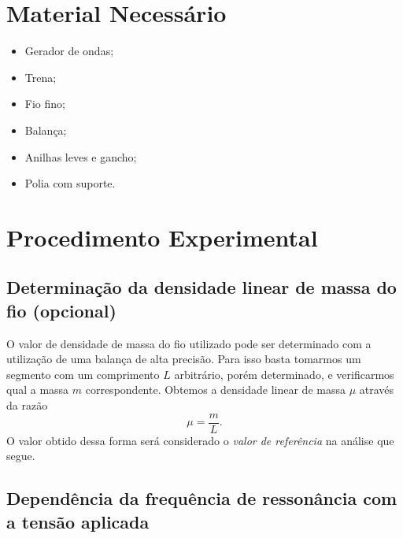 \section{Material Necessário}

\begin{itemize}
	\item Gerador de ondas;
	\item Trena;
	\item Fio fino;
	\item Balança;
	\item Anilhas leves e gancho;
	\item Polia com suporte.
\end{itemize}

\section{Procedimento Experimental}

\subsection{Determinação da densidade linear de massa do fio (opcional)}

O valor de densidade de massa do fio utilizado pode ser determinado com a utilização de uma balança de alta precisão. Para isso basta tomarmos um segmento com um comprimento $L$ arbitrário, porém determinado, e verificarmos qual a massa $m$ correspondente. Obtemos a densidade linear de massa $\mu$ através da razão
\begin{equation}
	\mu = \frac{m}{L}.
\end{equation}
%
O valor obtido dessa forma será considerado o \emph{valor de referência} na análise que segue.

\subsection{Dependência da frequência de ressonância com a tensão aplicada}

